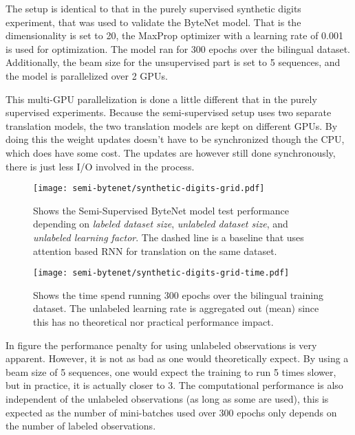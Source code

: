 The setup is identical to that in the purely supervised synthetic digits experiment, that was used to validate the ByteNet model. That is the dimensionality is set to 20, the MaxProp optimizer with a learning rate of 0.001 is used for optimization. The model ran for 300 epochs over the bilingual dataset. Additionally, the beam size for the unsupervised part is set to 5 sequences, and the model is parallelized over 2 GPUs.

This multi-GPU parallelization is done a little different that in the purely supervised experiments. Because the semi-supervised setup uses two separate translation models, the two translation models are kept on different GPUs. By doing this the weight updates doesn't have to be synchronized though the CPU, which does have some cost. The updates are however still done synchronously, there is just less I/O involved in the process.

\begin{figure}[h]
    \centering
    \texttt{[image: semi-bytenet/synthetic-digits-grid.pdf]}
    \caption{Shows the Semi-Supervised ByteNet model test performance depending on \textit{labeled dataset size}, \textit{unlabeled dataset size}, and \textit{unlabeled learning factor}. The dashed line is a baseline that uses attention based RNN for translation on the same dataset.}
     \label{fig:result:semi-bytenet:missrate}
\end{figure}

\begin{figure}[h]
    \centering
    \texttt{[image: semi-bytenet/synthetic-digits-grid-time.pdf]}
    \caption{Shows the time spend running 300 epochs over the bilingual training dataset. The unlabeled learning rate is aggregated out (mean) since this has no theoretical nor practical performance impact.}
    \label{fig:result:semi-bytenet:time}
\end{figure}

In figure \label{fig:result:semi-bytenet:time} the performance penalty for using unlabeled observations is very apparent. However, it is not as bad as one would theoretically expect. By using a beam size of 5 sequences, one would expect the training to run 5 times slower, but in practice, it is actually closer to 3. The computational performance is also independent of the unlabeled observations (as long as some are used), this is expected as the number of mini-batches used over 300 epochs only depends on the number of labeled observations.

